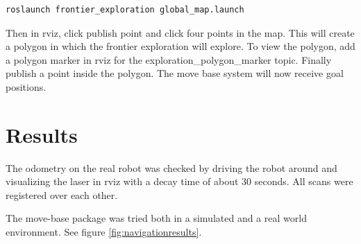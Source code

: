 \documentclass[a4paper]{article}
\begin{document}
\begin{lstlisting}[language=bash,
    label=lst:robotlimits]
roslaunch frontier_exploration global_map.launch
\end{lstlisting}

Then in rviz, click publish point and click four points in the map. This will create
a polygon in which the frontier exploration will explore. To view the polygon,
add a polygon marker in rviz for the exploration\_polygon\_marker topic.
Finally publish a point inside the polygon. The move base system will now receive
goal positions.


\section{Results}

The odometry on the real robot was checked by driving the robot around and visualizing the
laser in rviz with a decay time of about 30 seconds. All scans were registered over
each other.

The move-base package was tried both in a simulated and a real world environment.
See figure \ref{fig:navigationresults}.
\end{document}
